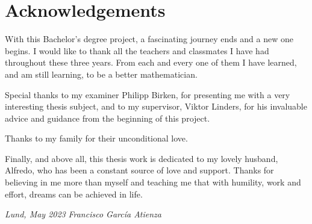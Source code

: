 
\chapter*{Acknowledgements}

		


With this Bachelor's degree project, a fascinating journey ends and a new one begins. I would like to thank all the teachers and classmates I have had throughout these three years. From each and every one of them I have learned, and am still learning, to be a better mathematician.

Special thanks to my examiner Philipp Birken, for presenting me with a very interesting thesis subject, and to my supervisor, Viktor Linders, for his invaluable advice and guidance from the beginning of this project. 

Thanks to my family for their unconditional love.

Finally, and above all, this thesis work is dedicated to my lovely husband, Alfredo, who has been a constant source of love and support. Thanks for believing in me more than myself and teaching me that with humility, work and effort, dreams can be achieved in life.

\addvspace{1.3cm}

\textit{Lund, May 2023} \hfill \textit{Francisco García Atienza}









